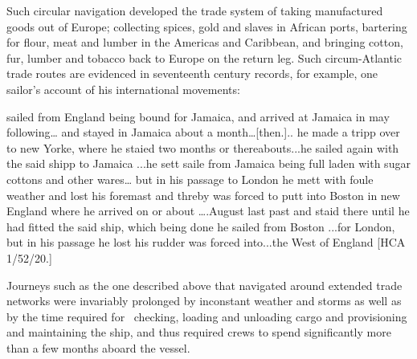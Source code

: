 \begin{styleStandard}
Such circular navigation developed the trade system of taking manufactured goods out of Europe; collecting spices, gold and slaves in African ports, bartering for flour, meat and lumber in the Americas and Caribbean, and bringing cotton, fur, lumber and tobacco back to Europe on the return leg. Such circum-Atlantic trade routes are evidenced in seventeenth century records, for example, one sailor’s account of his international movements:
\end{styleStandard}

\begin{styleStandard}
 sailed from England being bound for Jamaica, and arrived at Jamaica in may following… and stayed in Jamaica about a month…[then.].. he made a tripp over to new Yorke, where he staied two months or thereabouts...he sailed again with the said shipp to Jamaica ...he sett saile from Jamaica being full laden with sugar cottons and other wares… but in his passage to London he mett with foule weather and lost his foremast and threby was forced to putt into Boston in new England where he arrived on or about ….August last past and staid there until he had fitted the said ship, which being done he sailed from Boston ...for London, but in his passage he lost his rudder was forced into...the West of England [HCA 1/52/20.]
\end{styleStandard}

\begin{styleStandard}
Journeys such as the one described above that navigated around extended trade networks were invariably prolonged by inconstant weather and storms as well as by the time required for \ checking, loading and unloading cargo and provisioning and maintaining the ship, and thus required crews to spend significantly more than a few months aboard the vessel. 
\end{styleStandard}

